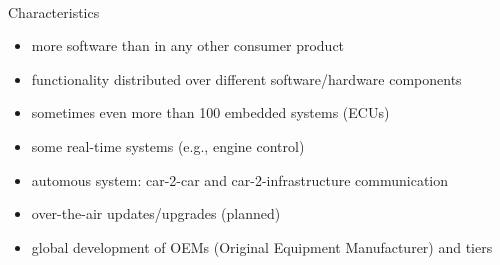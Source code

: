 \begin{frame}{\insertsubsection\ \mytitlesource{\staron}}
	\begin{fancycolumns}[animation=none]
		\begin{definition}{Characteristics}
			\begin{itemize}
				\item more software than in any other consumer product
				\item functionality distributed over different software/hardware components
				\item sometimes even more than 100 embedded systems (ECUs)
				\item some real-time systems (e.g., engine control)
				\item automous system: car-2-car and car-2-infrastructure communication
				\item over-the-air updates/upgrades (planned)
				\item global development of OEMs (Original Equipment Manufacturer) and tiers 
			\end{itemize}
		\end{definition}
		\nextcolumn
	\end{fancycolumns}
\end{frame}

